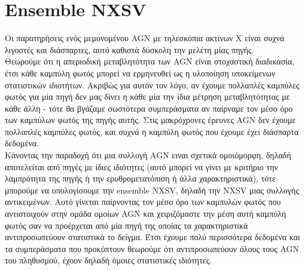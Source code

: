 \section{\textlatin{Ensemble NXSV}}

Οι παρατηρήσεις ενός μεμονομένου \textlatin{AGN} με τηλεσκόπια ακτίνων Χ είναι συχνά λιγοστές και διάσπαρτες, αυτό καθιστά δύσκολη την μελέτη μίας πηγής. \\
Θεωρούμε ότι η απεριοδική μεταβλητότητα των \textlatin{AGN} είναι στοχαστική διαδικασία, έτσι κάθε καμπύλη φωτός μπορεί να ερμηνευθεί ως η υλοποίηση υποκείμενων στατιστικών ιδιοτήτων. Ακριβώς για αυτόν τον λόγο, αν έχουμε πολλαπλές καμπύλες φωτός για μία πηγή δεν μας δίνει η κάθε μία την ίδια μέτρηση μεταβλητότητας με κάθε άλλη - τότε θα βγάζαμε σωστότερα συμπεράσματα αν παίρναμε τον μέσο όρο των καμπύλων φωτός της πηγής αυτής. Στις μακρόχρονες έρευνες \textlatin{AGN} δεν έχουμε πολλαπλές καμπύλες φωτός, και συχνά η καμπύλη φωτός που έχουμε έχει διάσπαρτα δεδομένα.\\ 
Κάνοντας την παραδοχή ότι μια συλλογή \textlatin{AGN} ειναι σχετικά ομοιόμορφη, δηλαδή αποτελείται από πηγές με ίδιες ιδιότητες (αυτό μπορεί να γίνει με κριτήριο την λαμπρότητα της πηγής ή την ερυθρομετατόπιση ή άλλα χαρακτηριστικά), τότε μπορούμε να υπολογίσουμε την \textlatin{ensemble NXSV}, δηλαδή την \textlatin{NXSV} μιας συλλογής αντικειμένων. Αυτό γίνεται παίρνοντας τον μέσο όρο των καμπυλών φωτός που αντιστοιχούν στην ομάδα ομοίων \textlatin{AGN} και χειριζόμαστε την μέση αυτή καμπύλη φωτός σαν να προέρχεται από μία πηγή της οποίας τα χαρακτηριστικά αντιπροσωπεύουν στατιστικά το δείγμα. Έτσι έχουμε πολύ περισσότερα δεδομένα και τα συμπεράσματα που προκύπτουν θεωρούμε ότι αντιπροσωπεύουν όλους τους \textlatin{AGN} του πληθυσμού, έχουν δηλαδή όμοιες στατιστικές ιδιότητες\cite{2013ApJ...771....9A}. 

